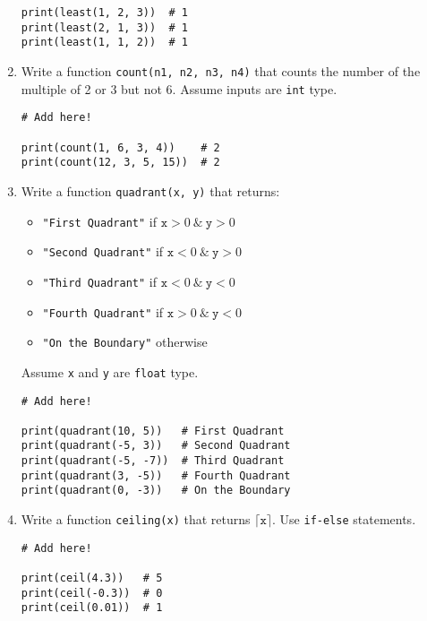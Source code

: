 \documentclass[../main.tex]{subfiles}
\begin{document}
\begin{enumerate}
\begin{verbatim}
print(least(1, 2, 3))  # 1
print(least(2, 1, 3))  # 1
print(least(1, 1, 2))  # 1
\end{verbatim}

\item Write a function \texttt{count(n1, n2, n3, n4)} that counts the number of
  the multiple of 2 or 3 but not 6. Assume inputs are \texttt{int} type.
\begin{verbatim}
# Add here!

print(count(1, 6, 3, 4))    # 2
print(count(12, 3, 5, 15))  # 2
\end{verbatim}

\item Write a function \texttt{quadrant(x, y)} that returns:
\begin{itemize}
  \item \texttt{"First Quadrant"} if $\texttt{x} > 0\ \&\ \texttt{y} > 0$
  \item \texttt{"Second Quadrant"} if $\texttt{x} < 0\ \&\ \texttt{y} > 0$
  \item \texttt{"Third Quadrant"} if $\texttt{x} < 0\ \&\ \texttt{y} < 0$
  \item \texttt{"Fourth Quadrant"} if $\texttt{x} > 0\ \&\ \texttt{y} < 0$
\item \texttt{"On the Boundary"} otherwise
\end{itemize}
Assume \texttt{x} and \texttt{y} are \texttt{float} type.
\begin{verbatim}
# Add here!

print(quadrant(10, 5))   # First Quadrant
print(quadrant(-5, 3))   # Second Quadrant
print(quadrant(-5, -7))  # Third Quadrant
print(quadrant(3, -5))   # Fourth Quadrant
print(quadrant(0, -3))   # On the Boundary
\end{verbatim}

\item Write a function \texttt{ceiling(x)} that returns $\lceil\texttt{x}\rceil$.
Use \texttt{if-else} statements.
\begin{verbatim}
# Add here!

print(ceil(4.3))   # 5
print(ceil(-0.3))  # 0
print(ceil(0.01))  # 1
\end{verbatim}


\end{enumerate}
\end{document}
